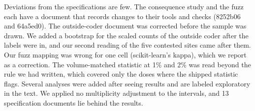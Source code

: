 \documentclass[10pt]{article}
\theoremstyle{definition}
\begin{document}
Deviations from the specifications are few. The consequence study and the fuzz each have a document that records changes to their tools and checks (8252b06 and 64a5ed0). The outside-coder document was corrected before the sample was drawn. We added a bootstrap for the scaled counts of the outside coder after the labels were in, and our second reading of the five contested sites came after them. Our fuzz mapping was wrong for one cell (scikit-learn's kappa), which we report as a correction. The volume-matched statistic at 1\% and 2\% was read beyond the rule we had written, which covered only the doses where the shipped statistic flags. Several analyses were added after seeing results and are labeled exploratory in the text. We applied no multiplicity adjustment to the intervals, and 13 specification documents lie behind the results.
\end{document}
